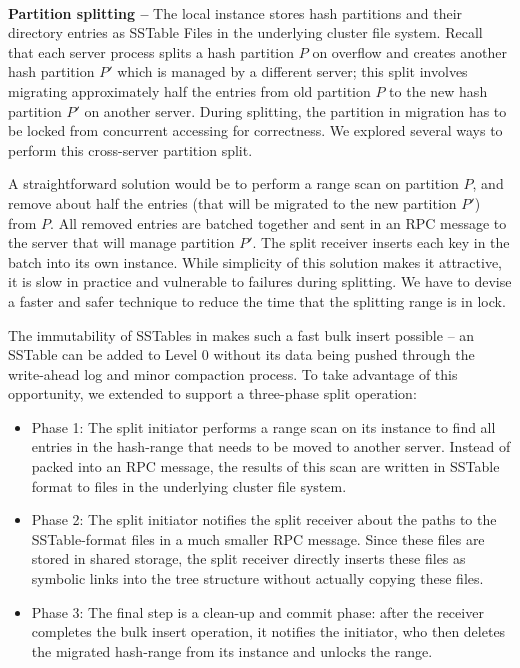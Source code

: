~\\
\textbf{Partition splitting -- }
The local \tfs instance stores \giga hash partitions and their directory
entries as SSTable Files in the underlying cluster file system.
Recall that each \giga server process splits a hash partition $P$ on
overflow and creates another hash partition $P'$ which is managed by a
different server; this split involves migrating approximately half the entries
from old partition $P$ to the new hash partition $P'$ on another server.
During splitting, the partition in migration has to be locked from
concurrent accessing for correctness.
We explored several ways to perform this cross-server partition split.

A straightforward solution would be to perform a range scan on
partition $P$, and remove about half the entries
(that will be migrated to the new partition $P'$) from $P$.
All removed entries are batched together
and sent in an RPC message to the server that will manage partition $P'$.
The split receiver inserts each key in the batch into its own \tfs instance.
While simplicity of this solution makes it attractive,
it is slow in practice and vulnerable to failures during splitting.
We have to devise a faster and safer technique to
reduce the time that the splitting range is in lock.

The immutability of SSTables in \ldb makes such a fast bulk insert possible --
an SSTable can be added to Level 0 without its data being pushed through the
write-ahead log and minor compaction process.
To take advantage of this opportunity, we extended \tfs
to support a three-phase split operation:

\begin{itemize}
\item{Phase 1:} The split initiator performs a range scan on its \tfs instance
to find all entries in the hash-range that needs to be moved to another server.
Instead of packed into an RPC message,
the results of this scan are written in SSTable format to files in the
underlying cluster file system.

\item{Phase 2:} The split initiator notifies the split receiver about
the paths to the SSTable-format files in a much smaller RPC message.
Since these files are stored in shared storage,
the split receiver directly inserts these files as symbolic links
into the \ldb tree structure without actually copying these files.

\item{Phase 3:} The final step is a clean-up and commit phase:
after the receiver completes the bulk insert operation, it notifies the
initiator, who then deletes the migrated hash-range from its \tfs instance
and unlocks the range.
\end{itemize}


